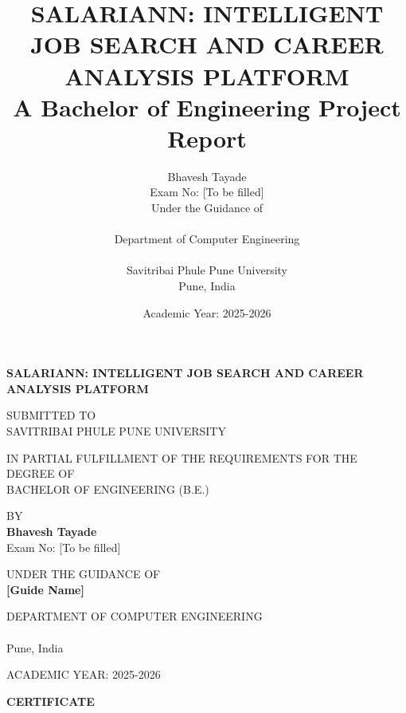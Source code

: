 \documentclass[12pt,a4paper,oneside]{report}
\title{
    \textbf{SALARIANN: INTELLIGENT JOB SEARCH AND CAREER ANALYSIS PLATFORM}\\
    \vspace{0.5cm}
    \large{A Bachelor of Engineering Project Report}
}
\author{
    Bhavesh Tayade\\
    Exam No: [To be filled]\\
    \vspace{0.5cm}
    Under the Guidance of\\
    [Guide Name]\\
    \vspace{0.5cm}
    Department of Computer Engineering\\
    [College Name]\\
    Savitribai Phule Pune University\\
    Pune, India
}
\date{Academic Year: 2025-2026}
\begin{document}
\begin{titlepage}
    \centering
    \vspace*{1cm}
    
    \textbf{\LARGE SALARIANN: INTELLIGENT JOB SEARCH AND CAREER ANALYSIS PLATFORM}
    
    \vspace{1.5cm}
    
    \Large SUBMITTED TO\\
    SAVITRIBAI PHULE PUNE UNIVERSITY
    
    \vspace{1cm}
    
    IN PARTIAL FULFILLMENT OF THE REQUIREMENTS FOR THE DEGREE OF\\
    BACHELOR OF ENGINEERING (B.E.)
    
    \vspace{1.5cm}
    
    BY\\
    \textbf{Bhavesh Tayade}\\
    Exam No: [To be filled]
    
    \vspace{1.5cm}
    
    UNDER THE GUIDANCE OF\\
    \textbf{[Guide Name]}
    
    \vspace{1.5cm}
    
    DEPARTMENT OF COMPUTER ENGINEERING\\
    [College Name]\\
    Pune, India
    
    \vspace{1cm}
    
    ACADEMIC YEAR: 2025-2026
    
    \vfill
\end{titlepage}

\newpage
\thispagestyle{empty}
\vspace*{2cm}

\begin{center}
    \textbf{\Large CERTIFICATE}
\end{center}
\end{document}
